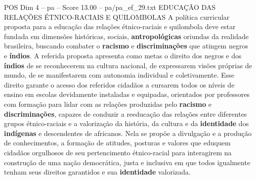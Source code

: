 \begin{textsample}{POS Dim 4 – pa – Score 13.00 – pa/pa\_ef\_29.txt}  \label{ex:f4_pos_011}
EDUCAÇÃO DAS RELAÇÕES ÉTNICO-RACIAIS E QUILOMBOLAS A política curricular proposta para a educação das relações étnico-raciais e quilombola deve estar fundada em dimensões históricas, sociais, \textbf{antropológicas} oriundas da realidade brasileira, buscando combater o \textbf{racismo} e \textbf{discriminações} que atingem negros e \textbf{índios}.
A referida proposta apresenta como metas o direito dos negros e dos \textbf{índios} de se reconhecerem na cultura nacional, de expressarem visões próprias de mundo, de se manifestarem com autonomia individual e coletivamente.
Esse direito garante o acesso dos referidos cidadãos a cursarem todos os níveis de ensino em escolas devidamente instaladas e equipadas, orientados por professores com formação para lidar com as relações produzidas pelo \textbf{racismo} e \textbf{discriminações}, capazes de conduzir a reeducação das relações entre diferentes grupos étnico-raciais e a valorização da história, da cultura e da \textbf{identidade} dos \textbf{indígenas} e descendentes de africanos.
Nela se propõe a divulgação e a produção de conhecimentos, a formação de atitudes, posturas e valores que eduquem cidadãos orgulhosos de seu pertencimento étnico-racial para interagirem na construção de uma nação democrática, justa e inclusiva em que todos igualmente tenham seus direitos garantidos e sua \textbf{identidade} valorizada.

\end{textsample}
